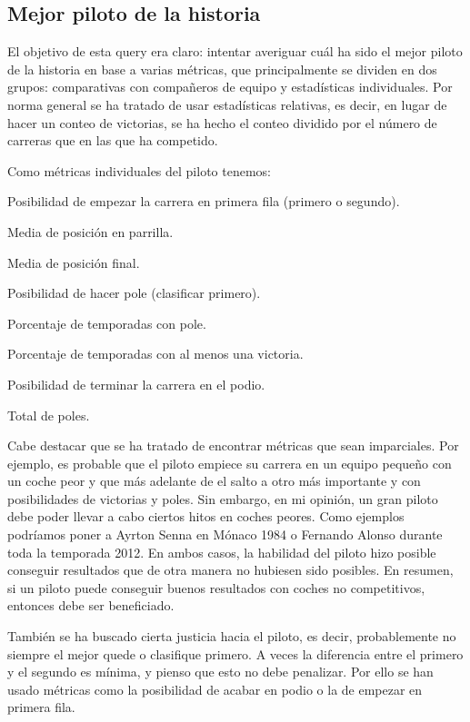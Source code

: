 \documentclass[12pt,twoside,titlepage]{report}
\begin{document}
\subsection{Mejor piloto de la historia}

El objetivo de esta query era claro: intentar averiguar cuál ha sido el mejor piloto de la historia en base a varias métricas, que principalmente se dividen en dos grupos: comparativas con compañeros de equipo y estadísticas individuales. Por norma general se ha tratado de usar estadísticas relativas, es decir, en lugar de hacer un conteo de victorias, se ha hecho el conteo dividido por el número de carreras que en las que ha competido.

Como métricas individuales del piloto tenemos:
\begin{compactitem}
	\item Posibilidad de empezar la carrera en primera fila (primero o segundo).
	\item Media de posición en parrilla.
	\item Media de posición final.
	\item Posibilidad de hacer pole (clasificar primero).
	\item Porcentaje de temporadas con pole.
	\item Porcentaje de temporadas con al menos una victoria.
	\item Posibilidad de terminar la carrera en el podio.
	\item Total de poles.
\end{compactitem}

Cabe destacar que se ha tratado de encontrar métricas que sean imparciales. Por ejemplo, es probable que el piloto empiece su carrera en un equipo pequeño con un coche peor y que más adelante de el salto a otro más importante y con posibilidades de victorias y poles. Sin embargo, en mi opinión, un gran piloto debe poder llevar a cabo ciertos hitos en coches peores. Como ejemplos podríamos poner a Ayrton Senna en Mónaco 1984 o Fernando Alonso durante toda la temporada 2012. En ambos casos, la habilidad del piloto hizo posible conseguir resultados que de otra manera no hubiesen sido posibles. En resumen, si un piloto puede conseguir buenos resultados con coches no competitivos, entonces debe ser beneficiado.

También se ha buscado cierta justicia hacia el piloto, es decir, probablemente no siempre el mejor quede o clasifique primero. A veces la diferencia entre el primero y el segundo es mínima, y pienso que esto no debe penalizar. Por ello se han usado métricas como la posibilidad de acabar en podio o la de empezar en primera fila.
\end{document}
